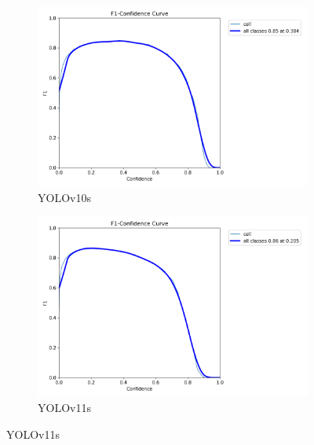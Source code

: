 \documentclass[12pt,a4paper,onecolumn,oneside]{report}
\begin{document}
\begin{figure}[H]
  \vspace{0.5cm}
  \begin{subfigure}[b]{0.48\textwidth}
    \centering
    \includegraphics[width=\textwidth]{figuras/resultados experimentacion/yolov10s/test3/BoxF1_curve.png}
    \caption{YOLOv10s}
    \label{fig:yolov10s_test3}
  \end{subfigure}
  \hfill
  \begin{subfigure}[b]{0.48\textwidth}
    \centering
    \includegraphics[width=\textwidth]{figuras/resultados experimentacion/yolov11s/test3/BoxF1_curve.png}
    \caption{YOLOv11s}
    \label{fig:yolov11s_test3}
  \end{subfigure}
  

\end{figure}
\end{document}
